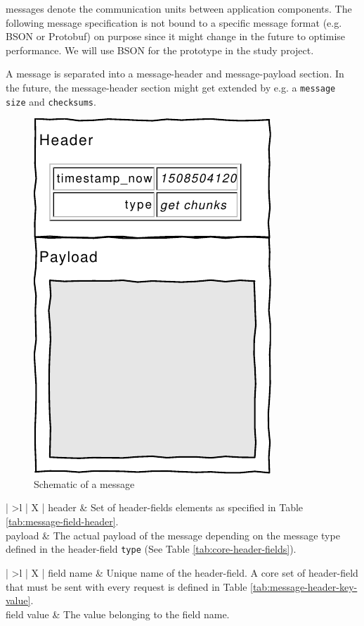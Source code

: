 \Glspl{message} denote the communication units between application components. The following message specification is not bound to a specific message format (e.g. BSON or Protobuf) on purpose since it might change in the future to optimise performance. We will use BSON for the prototype in the study project.

A \gls{message} is separated into a \gls{message-header} and \gls{message-payload} section. In the future, the \gls{message-header} section might get extended by e.g. a \texttt{message size} and \texttt{checksums}.

\begin{figure}[h]
    \centering
    \includegraphics[width=0.3\linewidth]{resources/message_schematic}
    \caption[\Gls{message} Schematic]{Schematic of a \gls{message}}
    \label{fig:messageschematic}
\end{figure}

\begin{table}[H]
    \begin{tabu}{| >{\ttfamily}l | X |}
        \hline
        header
        & Set of \glspl{header-field} elements as specified in Table \ref{tab:message-field-header}. \\
        
        \hline
        payload
        & The actual payload of the message depending on the message type defined in the \gls{header-field} \texttt{type} (See Table \ref{tab:core-header-fields}). \\

        \hline
    \end{tabu}
    \caption[\Gls{message} Structure]{Structure of a \gls{message}.}
    \label{tab:message}
\end{table}

\begin{table}[H]
\begin{tabu}{| >{\ttfamily}l | X |}
    \hline
    field name
    & Unique name of the \gls{header-field}. A core set of \gls{header-field} that must be sent with every request is defined in Table \ref{tab:message-header-key-value}. \\
    
    \hline
    field value
    & The value belonging to the field name. \\

    \hline
\end{tabu}
\caption{Structure of a \gls{header-field} element}
\label{tab:message-field-header}
\end{table}


